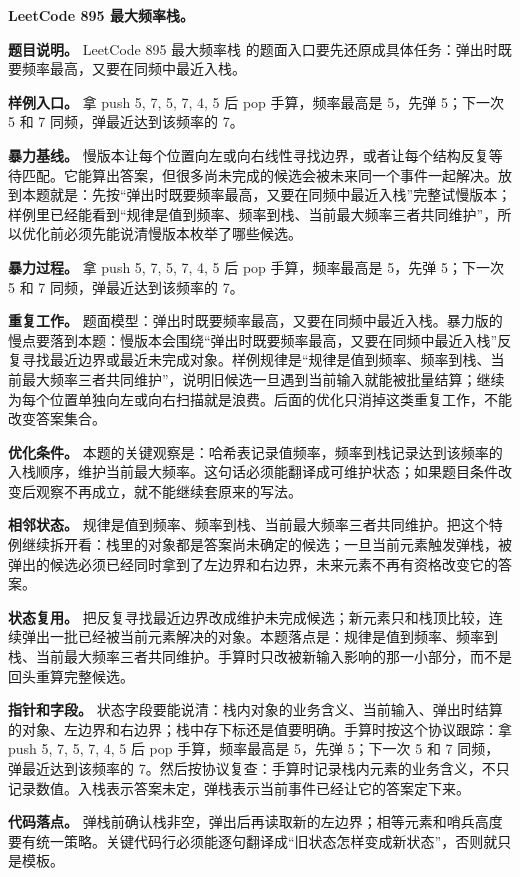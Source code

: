 \noindent\textbf{LeetCode 895 最大频率栈。}

\textbf{题目说明。} LeetCode 895 最大频率栈 的题面入口要先还原成具体任务：弹出时既要频率最高，又要在同频中最近入栈。

\textbf{样例入口。} 拿 push 5, 7, 5, 7, 4, 5 后 pop 手算，频率最高是 5，先弹 5；下一次 5 和 7 同频，弹最近达到该频率的 7。

\textbf{暴力基线。} 慢版本让每个位置向左或向右线性寻找边界，或者让每个结构反复等待匹配。它能算出答案，但很多尚未完成的候选会被未来同一个事件一起解决。放到本题就是：先按“弹出时既要频率最高，又要在同频中最近入栈”完整试慢版本；样例里已经能看到“规律是值到频率、频率到栈、当前最大频率三者共同维护”，所以优化前必须先能说清慢版本枚举了哪些候选。

\textbf{暴力过程。} 拿 push 5, 7, 5, 7, 4, 5 后 pop 手算，频率最高是 5，先弹 5；下一次 5 和 7 同频，弹最近达到该频率的 7。

\textbf{重复工作。} 题面模型：弹出时既要频率最高，又要在同频中最近入栈。暴力版的慢点要落到本题：慢版本会围绕“弹出时既要频率最高，又要在同频中最近入栈”反复寻找最近边界或最近未完成对象。样例规律是“规律是值到频率、频率到栈、当前最大频率三者共同维护”，说明旧候选一旦遇到当前输入就能被批量结算；继续为每个位置单独向左或向右扫描就是浪费。后面的优化只消掉这类重复工作，不能改变答案集合。

\textbf{优化条件。} 本题的关键观察是：哈希表记录值频率，频率到栈记录达到该频率的入栈顺序，维护当前最大频率。这句话必须能翻译成可维护状态；如果题目条件改变后观察不再成立，就不能继续套原来的写法。

\textbf{相邻状态。} 规律是值到频率、频率到栈、当前最大频率三者共同维护。把这个特例继续拆开看：栈里的对象都是答案尚未确定的候选；一旦当前元素触发弹栈，被弹出的候选必须已经同时拿到了左边界和右边界，未来元素不再有资格改变它的答案。

\textbf{状态复用。} 把反复寻找最近边界改成维护未完成候选；新元素只和栈顶比较，连续弹出一批已经被当前元素解决的对象。本题落点是：规律是值到频率、频率到栈、当前最大频率三者共同维护。手算时只改被新输入影响的那一小部分，而不是回头重算完整候选。

\textbf{指针和字段。} 状态字段要能说清：栈内对象的业务含义、当前输入、弹出时结算的对象、左边界和右边界；栈中存下标还是值要明确。手算时按这个协议跟踪：拿 push 5, 7, 5, 7, 4, 5 后 pop 手算，频率最高是 5，先弹 5；下一次 5 和 7 同频，弹最近达到该频率的 7。然后按协议复查：手算时记录栈内元素的业务含义，不只记录数值。入栈表示答案未定，弹栈表示当前事件已经让它的答案定下来。

\textbf{代码落点。} 弹栈前确认栈非空，弹出后再读取新的左边界；相等元素和哨兵高度要有统一策略。关键代码行必须能逐句翻译成“旧状态怎样变成新状态”，否则就只是模板。

